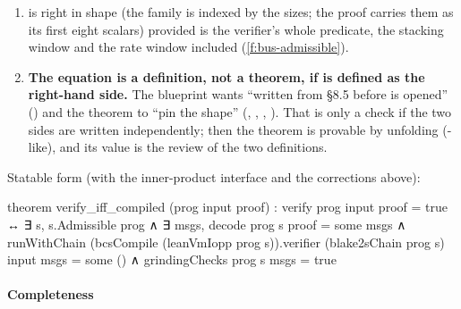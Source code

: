 \begin{sloppypar}
\begin{enumerate}
  a prover message (absorbed with tag 4, ), and the verifier's check
   () reads the
  \textbf{chain state} , which an ArkLib  does not see: its 
  takes the statement and the full transcript (). Either the interactive
  verifier recomputes the chain from the transcript (definable, since the chain is a function of
  statement and messages; it then depends on $H$ and is no longer an IOP verifier), or
  's right-hand side is a conjunction ``the compiled verifier accepts
  $∧$ every grinding check passes'', the second conjunct being about the chain. The sketch has
  neither.
\item \textbf{} is right in shape (the family is indexed by the sizes;
  the proof carries them as its first eight scalars) provided  is the verifier's
  whole predicate, the stacking window and the rate window included (\cref{f:bus-admissible}).
\item \textbf{The equation is a definition, not a theorem, if  is defined as the
  right-hand side.} The blueprint wants  ``written from §8.5 before
   is opened'' () and the theorem to ``pin the shape''
  (, , , ). That is only a check if the two sides
  are written independently; then the theorem is provable by unfolding (-like), and its
  value is the review of the two definitions.
\end{enumerate}
\end{sloppypar}

Statable form (with the inner-product interface and the corrections above):

\begin{leancode}
theorem verify_iff_compiled (prog input proof) :
    verify prog input proof = true ↔
      ∃ s, s.Admissible prog ∧ ∃ msgs, decode prog s proof = some msgs ∧
        runWithChain (bcsCompile (leanVmIopp prog s)).verifier (blake2sChain prog s) input msgs
          = some () ∧ grindingChecks prog s msgs = true
\end{leancode}

\paragraph{Completeness}\label{sec:gen-opening-completeness}

